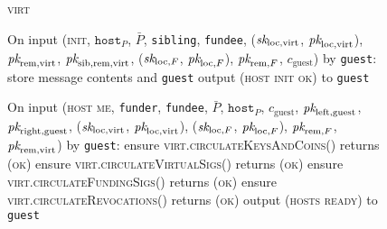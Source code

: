 \begin{figure}[H]
  \begin{processbox}{\textsc{virt}}
    \begin{algorithmic}[1]
      \State On input (\textsc{init}, $\texttt{host}_P$, $\bar{P}$,
      \texttt{sibling}, \texttt{fundee}, ($\textit{sk}_{\mathrm{loc}, \mathrm{virt}}$,
      $\textit{pk}_{\mathrm{loc}, \mathrm{virt}}$), $\textit{pk}_{\mathrm{rem}, \mathrm{virt}}$,
      $\textit{pk}_{\mathrm{sib}, \mathrm{rem}, \mathrm{virt}}$, ($\textit{sk}_{\mathrm{loc}, F}$,
      $\textit{pk}_{\mathrm{loc}, F}$), $\textit{pk}_{\mathrm{rem}, F}$, $c_{\mathrm{guest}}$) by
      \texttt{guest}:
      \Indent
        \State store message contents and \texttt{guest}
        \State output (\textsc{host init ok}) to \texttt{guest}
      \EndIndent
      \Statex

      \State On input (\textsc{host me}, \texttt{funder}, \texttt{fundee},
      $\bar{P}$, $\texttt{host}_P$, $c_{\mathrm{guest}}$, $\textit{pk}_{\mathrm{left},
      \mathrm{guest}}$, $\textit{pk}_{\mathrm{right}, \mathrm{guest}}$,
      ($\textit{sk}_{\mathrm{loc}, \mathrm{virt}}$, $\textit{pk}_{\mathrm{loc}, \mathrm{virt}}$),
      ($\textit{sk}_{\mathrm{loc}, F}$, $\textit{pk}_{\mathrm{loc}, F}$), $\textit{pk}_{\mathrm{rem}, F}$,
      $\textit{pk}_{\mathrm{rem}, \mathrm{virt}}$) by \texttt{guest}:
      \Indent
        \State ensure \textsc{virt.circulateKeysAndCoins}() returns (\textsc{ok})
        \State ensure \textsc{virt.circulateVirtualSigs}() returns (\textsc{ok})
        \State ensure \textsc{virt.circulateFundingSigs}() returns (\textsc{ok})
        \State ensure \textsc{virt.circulateRevocations}() returns (\textsc{ok})
        \State output (\textsc{hosts ready}) to \texttt{guest}
      \EndIndent
      \Statex


\end{algorithmic}
\end{processbox}
\end{figure}

